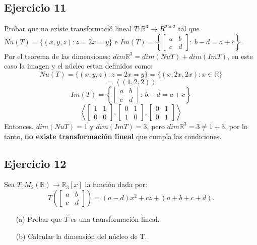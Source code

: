 \documentclass[a4paper,12pt]{article}
\begin{document}
\subsection{Ejercicio 11}
Probar que no existe transformació lineal $T:\mathds{R}^3\rightarrow R^{2\times 2}$ tal que $Nu(T)= \{ (x,y,z) : z = 2x = y \}$ e $Im(T)= \left \{ \begin{bmatrix} a & b \\ c & d \end{bmatrix} : \ b-d=a+c \right \}$. \\
Por el teorema de las dimensiones: $dim\mathds{R}^3=dim(NuT)+dim(ImT)$, en este caso la imagen y el núcleo estan definidos como: 
$$
Nu(T)= \{ (x,y,z) : z = 2x = y \} = \{ (x,2x,2x) : x \in \mathds{R} \}
$$
$$
= \left \langle (1,2,2) \right \rangle
$$
$$
Im(T)= \left \{ \begin{bmatrix} a & b \\ c & d \end{bmatrix} : \ b-d=a+c \right \}
$$
$$
\left \langle \begin{bmatrix} 1 & 1 \\ 0 & 0 \end{bmatrix}, \begin{bmatrix} 0 & 1 \\ 1 & 0 \end{bmatrix}, \begin{bmatrix} 0 & 1 \\ 0 & 1 \end{bmatrix} \right \rangle
$$
Entonces, $dim(NuT)=1$ y $dim(ImT)=3$, pero $dim\mathds{R}^3=3\neq1+3$, por lo tanto, \textbf{no existe transformación lineal} que cumpla las condiciones.
\subsection{Ejercicio 12}
Sea $T:M_2(\mathds{R})\to\mathds{R}_3[x]$ la función dada por:
$$
T \left ( \begin{bmatrix} a & b \\ c & d \end{bmatrix} \right ) = (a-d)x^2+cz+(a+b+c+d).
$$
\begin{itemize}
    \item[(a)] Probar que $T$ es una transformación lineal.
    \item[(b)] Calcular la dimensión del núcleo de T.
\end{itemize}
\end{document}

